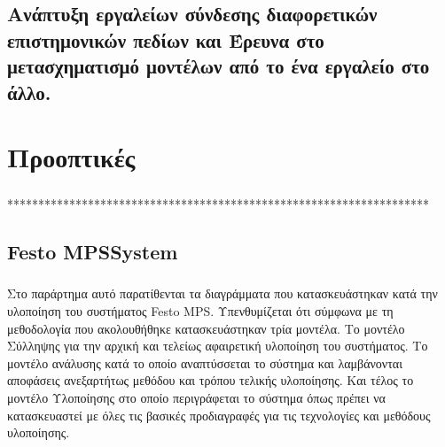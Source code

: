 \documentclass[a4paper,12pt,twoside]{report}
\begin{document}
{		\section{Ανάπτυξη εργαλείων σύνδεσης διαφορετικών επιστημονικών πεδίων και Έρευνα στο μετασχηματισμό μοντέλων από το ένα εργαλείο στο άλλο.}

	\chapter{Προοπτικές}
		\label{κεφ.:Προοπτικές}
		
		\paragraph{} {********************************************************************
		}
		


\begin{appendices}
	\chapter{Festo MPS\textregistered System}
	\label{κεφ.:Παράρτημα Festo MPS System}
	
		\paragraph{} {Στο παράρτημα αυτό παρατίθενται τα διαγράμματα που κατασκευάστηκαν κατά την υλοποίηση του συστήματος Festo MPS\textregistered. Υπενθυμίζεται ότι σύμφωνα με τη μεθοδολογία που ακολουθήθηκε κατασκευάστηκαν τρία μοντέλα. Το μοντέλο Σύλληψης για την αρχική και τελείως αφαιρετική υλοποίηση του συστήματος. Το μοντέλο ανάλυσης κατά το οποίο αναπτύσσεται το σύστημα και λαμβάνονται αποφάσεις ανεξαρτήτως μεθόδου και τρόπου τελικής υλοποίησης. Και τέλος το μοντέλο Υλοποίησης στο οποίο περιγράφεται το σύστημα όπως πρέπει να κατασκευαστεί με όλες τις βασικές προδιαγραφές για τις τεχνολογίες και μεθόδους υλοποίησης.
		}
		\FloatBarrier

\end{appendices}}
\end{document}
